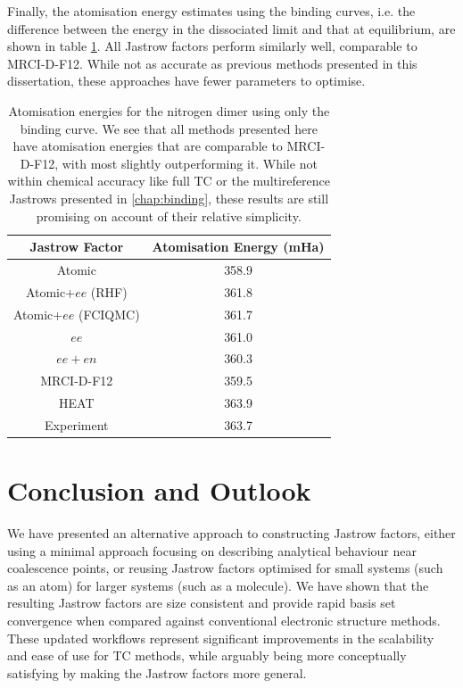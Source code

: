 Finally, the atomisation energy estimates using the binding curves, i.e. the difference between the energy in the dissociated limit and that at equilibrium, are shown in table \ref{tbl:binding-atomisation-energies-uni}. All Jastrow factors perform similarly well, comparable to MRCI-D-F12. While not as accurate as previous methods presented in this dissertation, these approaches have fewer parameters to optimise.

\begin{table}[htbp]
    \centering
        \begin{tabular}{c|c}
            Jastrow Factor & Atomisation Energy (mHa) \\
            \hline
            Atomic & 358.9 \\
            Atomic+$ee$ (RHF) & 361.8 \\
            Atomic+$ee$ (FCIQMC) & 361.7\\
            $ee$ & 361.0 \\
            $ee+en$ & 360.3 \\
            \bottomrule
            MRCI-D-F12 & 359.5 \\
            HEAT\supercite{fellerSurvey2008} & 363.9 \\
            Experiment\supercite{leroyAccurate2006} & 363.7
        \end{tabular}
    \caption{Atomisation energies for the nitrogen dimer using only the binding curve. We see that all methods presented here have atomisation energies that are comparable to MRCI-D-F12, with most slightly outperforming it. While not within chemical accuracy like full TC or the multireference Jastrows presented in \autoref{chap:binding}, these results are still promising on account of their relative simplicity.
    }
    \label{tbl:binding-atomisation-energies-uni}
\end{table}

\section{Conclusion and Outlook}

We have presented an alternative approach to constructing Jastrow factors, either using a minimal approach focusing on describing analytical behaviour near coalescence points, or reusing Jastrow factors optimised for small systems (such as an atom) for larger systems (such as a molecule). We have shown that the resulting Jastrow factors are size consistent and provide rapid basis set convergence when compared against conventional electronic structure methods.
These updated workflows represent significant improvements in the scalability and ease of use for TC methods, while arguably being more conceptually satisfying by making the Jastrow factors more general.

